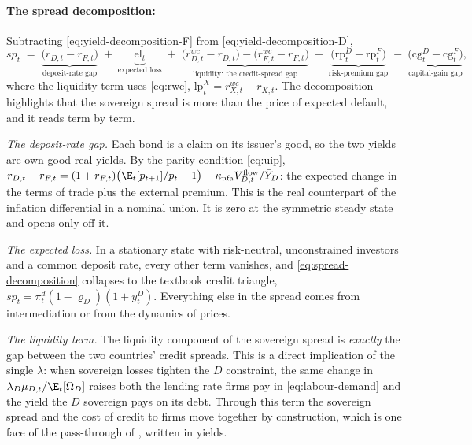 \paragraph{The spread decomposition:}
Subtracting \eqref{eq:yield-decomposition-F} from
\eqref{eq:yield-decomposition-D},
\begin{equation}
sp_t
\;=\;\underbrace{\bigl(r_{D,t}-r_{F,t}\bigr)}_{\text{deposit-rate gap}}
\;+\;\underbrace{\mathrm{el}_t}_{\text{expected loss}}
\;+\;\underbrace{\bigl(r^{wc}_{D,t}-r_{D,t}\bigr)-\bigl(r^{wc}_{F,t}-r_{F,t}\bigr)}_{\text{liquidity: the credit-spread gap}}
\;+\;\underbrace{\bigl(\mathrm{rp}^{D}_t-\mathrm{rp}^{F}_t\bigr)}_{\text{risk-premium gap}}
\;-\;\underbrace{\bigl(\mathrm{cg}^{D}_t-\mathrm{cg}^{F}_t\bigr)}_{\text{capital-gain gap}},
\label{eq:spread-decomposition}
\end{equation}
where the liquidity term uses \eqref{eq:rwc},
$\mathrm{lp}^{X}_t=r^{wc}_{X,t}-r_{X,t}$. The decomposition highlights that the
sovereign spread is more than the price of expected default, and it reads term
by term.

\emph{The deposit-rate gap.} Each bond is a claim on its issuer's good, so the
two yields are own-good real yields. By the parity condition \eqref{eq:uip},
$r_{D,t}-r_{F,t}=(1+r_{F,t})\bigl(\E_t[p_{t+1}]/p_t-1\bigr)
-\kappa_{\rm nfa}V^{\rm flow}_{D,t}/\bar Y_D$: the expected change in the terms of
trade plus the external premium. This is the real counterpart of the inflation
differential in a nominal union. It is zero at the symmetric steady state and
opens only off it.

\emph{The expected loss.} In a stationary state with risk-neutral, unconstrained
investors and a common deposit rate, every other term vanishes, and
\eqref{eq:spread-decomposition} collapses to the textbook credit triangle,
$sp_t=\pi^{d}_t(1-\varrho_D)(1+y^{D}_t)$. Everything else in the spread comes from
intermediation or from the dynamics of prices.

\emph{The liquidity term.} The liquidity component of the sovereign spread is
\emph{exactly} the gap between the two countries' credit spreads. This is a
direct implication of the single $\lambda$: when sovereign losses tighten the $D$
constraint, the same change in $\lambda_D\mu_{D,t}/\E_t[\Omega_D]$ raises both
the lending rate firms pay in \eqref{eq:labour-demand} and the yield the $D$
sovereign pays on its debt. Through this term the sovereign spread and the cost of
credit to firms move together by construction, which is one face of the
pass-through of \cite{bocola2016pass}, written in yields.

